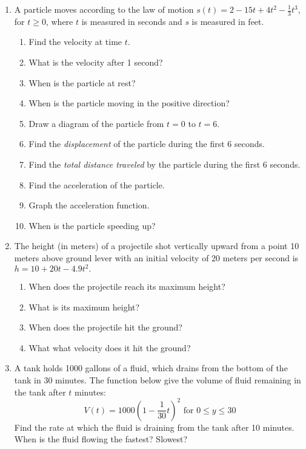 \documentclass[11pt,fleqn]{article}
\begin{document}
\setlength{\parindent}{0cm}
\renewcommand{\headrulewidth}{0pt}
\newcommand{\blank}[1]{\rule{#1}{0.75pt}}
\renewcommand{\d}{\displaystyle}
\vspace*{-0.7in}
\begin{center}
 {\large{ }}
\end{center}
\begin{enumerate}
\item A particle moves according to the law of motion $s(t)=2-15t+4t^2-\frac{1}{3}t^3,$ for $t \geq 0$, where $t$ is measured in seconds and $s$ is measured in feet.
	\begin{enumerate}
	\item Find the velocity at time $t.$
	\vfill
	\item What is the velocity after 1 second?
	\vfill
	\item When is the particle at rest?
	\vfill
	\item When is the particle moving in the positive direction?
	\vfill
	\item Draw a diagram of the particle from $t=0$ to $t=6.$
	\vfill
	\item Find the \emph{displacement} of the particle during the first 6 seconds.
	\vfill
	\item Find the \emph{total distance traveled} by the particle during the first 6 seconds.
	\vfill
	\item Find the acceleration of the particle.
	\vfill
	\item Graph the acceleration function.
	\vfill
	\item When is the particle speeding up?
	\vfill
	\end{enumerate}
\newpage
\item The height (in meters) of a projectile shot vertically upward from a point 10 meters above ground lever with an initial velocity of 20 meters per second is $h=10+20t-4.9t^2.$
	\begin{enumerate}
	\item When does the projectile reach its maximum height?
	\vfill
	\item What is its maximum  height?
	\vfill
	\item When does the projectile hit the ground?
	\vfill
	\item What what velocity does it hit the ground?
	\vfill
	\end{enumerate}
\item A tank holds 1000 gallons of a fluid, which drains from the bottom of the tank in 30 minutes. The function below give the volume of fluid remaining in the tank after $t$ minutes:
$$V(t)=1000 \left( 1-\frac{1}{30}t \right)^2 \text{  for   } 0 \leq y \leq 30$$
Find  the rate at which the fluid is draining from the tank after 10 minutes. When is the fluid flowing the fastest? Slowest?
\vspace{2.5in}
\end{enumerate}
\end{document}

